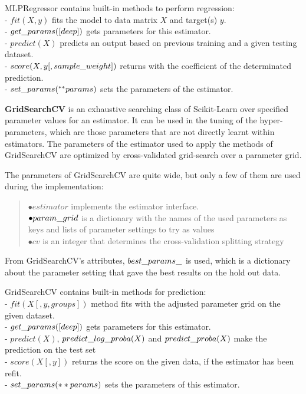 MLPRegressor contains built-in methods to perform regression:\\
- $fit(X, y)$ fits the model to data matrix $X$ and target(s) $y$.\\
- $get\char`_params([deep])$ gets parameters for this estimator.\\
- $predict(X)$ predicts an output based on previous training and a given testing dataset.\\
- $score(X, y[, sample\char`_weight])$ returns with the coefficient of the determinated prediction.\\
- $set\char`_params(^{**} params)$ sets the parameters of the estimator.\bigskip


\textbf{GridSearchCV} is an exhaustive searching class of Scikit-Learn over specified parameter values for an estimator. It can be used in the tuning of the hyper-parameters, which are those parameters that are not directly learnt within estimators. The parameters of the estimator used to apply the methods of GridSearchCV are optimized by cross-validated grid-search over a parameter grid.\medskip

\noindent The parameters of GridSearchCV are quite wide, but only a few of them are used during the implementation:
\begin{verse}
	$\bullet estimator$ implements the estimator interface. \\
	$\bullet param\char`_grid$ is a dictionary with the names of the used parameters as keys and lists of parameter settings to try as values\\
	$\bullet cv$ is an integer that determines the cross-validation splitting strategy
\end{verse}

From GridSearchCV's attributes, $best\char`_params\char`_$ is used, which is a dictionary about the parameter setting that gave the best results on the hold out data.\medskip

\noindent GridSearchCV contains built-in methods for prediction:\\
- $fit(X[, y, groups])$ method fits with the adjusted parameter grid on the given dataset.\\
- $get\char`_params([deep])$ gets parameters for this estimator.\\
- $predict(X)$, $predict\char`_log\char`_proba(X)$ and $predict\char`_proba(X)$ make the prediction on the test set\\
- $score(X[, y])$ returns the score on the given data, if the estimator has been refit.\\
- $set\char`_params(**params)$ sets the parameters of this estimator.\bigskip


